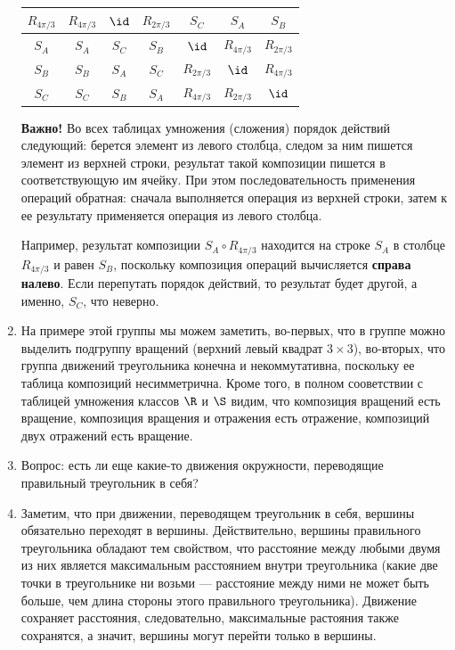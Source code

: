 \begin{enumerate}
\begin{table}[htb!]
\begin{center}
\begin{tabular}{c||c|c|c||c|c|c|}
$R_{4\pi/3}$ & $R_{4\pi/3}$ & $\id$        & $R_{2\pi/3}$ & $S_C$        & $S_A$        & $S_B$  \\  \hline\hline
$S_A$        & $S_A$        & $S_C$        & $S_B$        & $\id$        & $R_{4\pi/3}$ & $R_{2\pi/3}$  \\  \hline
$S_B$        & $S_B$        & $S_A$        & $S_C$        & $R_{2\pi/3}$ & $\id$        & $R_{4\pi/3}$  \\  \hline
$S_C$        & $S_C$        & $S_B$        & $S_A$        & $R_{4\pi/3}$ & $R_{2\pi/3}$ & $\id$   \\  \hline
\end{tabular}
\end{center}\end{table}

\textbf{Важно!} Во всех таблицах умножения (сложения) порядок действий следующий: берется элемент из левого столбца, следом за ним пишется элемент из верхней строки, результат такой композиции пишется в соответствующую им ячейку. При этом последовательность применения операций обратная: сначала выполняется операция из верхней строки, затем к ее результату применяется операция из левого столбца.

Например, результат композиции $S_A\circ R_{4\pi/3}$ находится на строке $S_A$ в столбце $R_{4\pi/3}$ и равен $S_B$, поскольку композиция операций вычисляется \textbf{справа налево}. Если перепутать порядок действий, то результат будет другой, а именно, $S_C$, что неверно.

\item На примере этой группы мы можем заметить, во-первых, что в группе можно выделить подгруппу вращений (верхний левый квадрат $3\times 3$), во-вторых, что группа движений треугольника конечна и некоммутативна, поскольку ее таблица композиций несимметрична. Кроме того, в полном сооветствии с таблицей умножения классов $\R$ и $\S$ видим, что композиция вращений есть вращение, композиция вращения и отражения есть отражение, композиций двух отражений есть вращение.
\item Вопрос: есть ли еще какие-то движения окружности, переводящие правильный треугольник в себя?
\item Заметим, что при движении, переводящем треугольник в себя, вершины обязательно переходят в вершины.
Действительно, вершины правильного треугольника обладают тем свойством, что расстояние между любыми двумя из них является максимальным расстоянием внутри треугольника (какие две точки в треугольнике ни возьми --- расстояние между ними не может быть больше, чем длина стороны этого правильного треугольника). Движение сохраняет расстояния, следовательно, максимальные растояния также сохранятся, а значит, вершины могут перейти только в вершины.


\end{enumerate}
